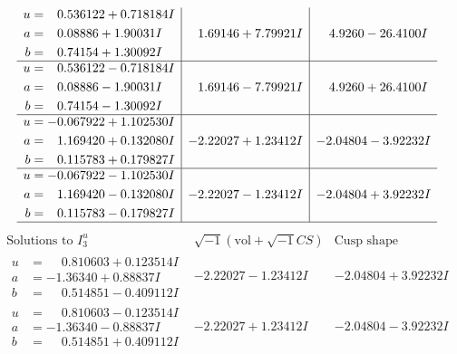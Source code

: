 \documentclass[1p]{elsarticle_modified}
\theoremstyle{definition}
\newcommand{\I}{\sqrt{-1}}
\begin{document}
$$\begin{array}{c|c|c}
\begin{aligned}
u &= \phantom{-}0.536122 + 0.718184 I \\
a &= \phantom{-}0.08886 + 1.90031 I \\
b &= \phantom{-}0.74154 + 1.30092 I\end{aligned}
 & \phantom{-}1.69146 + 7.79921 I & \phantom{-}4.9260 - 26.4100 I \\ \hline\begin{aligned}
u &= \phantom{-}0.536122 - 0.718184 I \\
a &= \phantom{-}0.08886 - 1.90031 I \\
b &= \phantom{-}0.74154 - 1.30092 I\end{aligned}
 & \phantom{-}1.69146 - 7.79921 I & \phantom{-}4.9260 + 26.4100 I \\ \hline\begin{aligned}
u &= -0.067922 + 1.102530 I \\
a &= \phantom{-}1.169420 + 0.132080 I \\
b &= \phantom{-}0.115783 + 0.179827 I\end{aligned}
 & -2.22027 + 1.23412 I & -2.04804 - 3.92232 I \\ \hline\begin{aligned}
u &= -0.067922 - 1.102530 I \\
a &= \phantom{-}1.169420 - 0.132080 I \\
b &= \phantom{-}0.115783 - 0.179827 I\end{aligned}
 & -2.22027 - 1.23412 I & -2.04804 + 3.92232 I\\
 \hline 
 \end{array}$$\newpage$$\begin{array}{c|c|c}  
\text{Solutions to }I^u_{3}& \I (\text{vol} + \sqrt{-1}CS) & \text{Cusp shape}\\
 \hline 
\begin{aligned}
u &= \phantom{-}0.810603 + 0.123514 I \\
a &= -1.36340 + 0.88837 I \\
b &= \phantom{-}0.514851 - 0.409112 I\end{aligned}
 & -2.22027 - 1.23412 I & -2.04804 + 3.92232 I \\ \hline\begin{aligned}
u &= \phantom{-}0.810603 - 0.123514 I \\
a &= -1.36340 - 0.88837 I \\
b &= \phantom{-}0.514851 + 0.409112 I\end{aligned}
 & -2.22027 + 1.23412 I & -2.04804 - 3.92232 I \\ \hline\begin{aligned}

\end{aligned}
\end{array}$$
\end{document}
